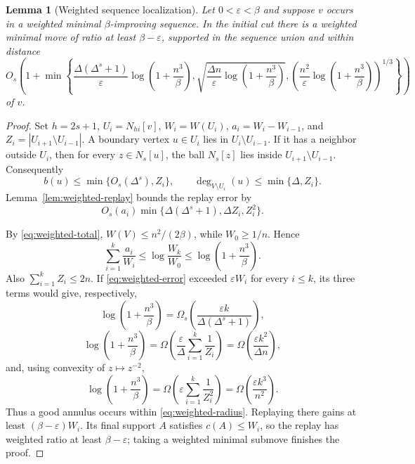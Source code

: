 \documentclass[11pt]{article}
\newtheorem{lemma}[theorem]{Lemma}
\theoremstyle{definition}
\theoremstyle{remark}
\newcommand{\eps}{\varepsilon}
\newcommand{\N}{N}
\begin{document}
\begin{lemma}[Weighted sequence localization]\label{lem:weighted-localization}
Let $0<\eps<\beta$ and suppose $v$ occurs in a weighted minimal
$\beta$-improving sequence.  In the initial cut there is a weighted minimal move of
ratio at least $\beta-\eps$, supported in the sequence union and within distance
\begin{equation}\label{eq:weighted-radius}
 O_s\!\left(1+\min\left\{
 \frac{\Delta(\Delta^s+1)}{\eps}\log\!\left(1+\frac{n^3}{\beta}\right),
 \sqrt{\frac{\Delta n}{\eps}\log\!\left(1+\frac{n^3}{\beta}\right)},
 \left(\frac{n^2}{\eps}\log\!\left(1+\frac{n^3}{\beta}\right)\right)^{1/3}
 \right\}\right)
\end{equation}
of $v$.
\end{lemma}

\begin{proof}
Set $h=2s+1$, $U_i=\N_{hi}[v]$, $W_i=W(U_i)$,
$a_i=W_i-W_{i-1}$, and $Z_i=|U_{i+1}\setminus U_{i-1}|$.  A boundary vertex
$u\in U_i$ lies in $U_i\setminus U_{i-1}$.  If it has a neighbor outside $U_i$,
then for every $z\in\N_s[u]$, the ball $\N_s[z]$ lies inside
$U_{i+1}\setminus U_{i-1}$.  Consequently
\[
 b(u)\leq\min\{O_s(\Delta^s),Z_i\},
 \qquad
 \deg_{V\setminus U_i}(u)\leq\min\{\Delta,Z_i\}.
\]
Lemma~\ref{lem:weighted-replay} bounds the replay error by
\begin{equation}\label{eq:weighted-error}
 O_s(a_i)\min\{\Delta(\Delta^s+1),\Delta Z_i,Z_i^2\}.
\end{equation}

By \eqref{eq:weighted-total}, $W(V)\leq n^2/(2\beta)$, while
$W_0\geq1/n$.  Hence
\begin{equation}\label{eq:weighted-harmonic}
 \sum_{i=1}^k\frac{a_i}{W_i}
 \leq\log\frac{W_k}{W_0}
 \leq\log\!\left(1+\frac{n^3}{\beta}\right).
\end{equation}
Also $\sum_{i=1}^kZ_i\leq2n$.  If \eqref{eq:weighted-error} exceeded
$\eps W_i$ for every $i\leq k$, its three terms would give, respectively,
\[
 \log\!\left(1+\frac{n^3}{\beta}\right)
 =\Omega_s\!\left(\frac{\eps k}{\Delta(\Delta^s+1)}\right),
\]
\[
 \log\!\left(1+\frac{n^3}{\beta}\right)
 =\Omega\!\left(\frac{\eps}{\Delta}\sum_{i=1}^k\frac1{Z_i}\right)
 =\Omega\!\left(\frac{\eps k^2}{\Delta n}\right),
\]
and, using convexity of $z\mapsto z^{-2}$,
\[
 \log\!\left(1+\frac{n^3}{\beta}\right)
 =\Omega\!\left(\eps\sum_{i=1}^k\frac1{Z_i^2}\right)
 =\Omega\!\left(\frac{\eps k^3}{n^2}\right).
\]
Thus a good annulus occurs within \eqref{eq:weighted-radius}.  Replaying there gains
at least $(\beta-\eps)W_i$.  Its final support $A$ satisfies $c(A)\leq W_i$, so the
replay has weighted ratio at least $\beta-\eps$; taking a weighted minimal submove
finishes the proof.
\end{proof}
\end{document}
